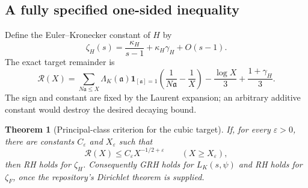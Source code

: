 \documentclass[11pt,letterpaper]{article}
\newtheorem{theorem}{Theorem}[section]
\theoremstyle{definition}\newtheorem{definition}[theorem]{Definition}
\theoremstyle{remark}\newtheorem{remark}[theorem]{Remark}
\newcommand{\one}{\mathbf 1}\newcommand{\code}[1]{\texttt{\small #1}}
\begin{document}
\subsection{A fully specified one-sided inequality}
Define the Euler--Kronecker constant of $H$ by
\[
 \zeta_H(s)=\frac{\kappa_H}{s-1}+\kappa_H\gamma_H+O(s-1).
\]
The exact target remainder is
\begin{equation}\label{eq:targetR}
 \boxed{\displaystyle
 \mathcal R(X)=
 \sum_{N\mathfrak a\le X}\Lambda_K(\mathfrak a)\one_{[\mathfrak a]=1}
 \left(\frac1{N\mathfrak a}-\frac1X\right)
 -\frac{\log X}{3}+\frac{1+\gamma_H}{3}.}
\end{equation}
The sign and constant are fixed by the Laurent expansion; an arbitrary additive constant
would destroy the desired decaying bound.

\begin{theorem}[Principal-class criterion for the cubic target]\label{thm:cubiccriterion}
If, for every $\varepsilon>0$, there are constants $C_\varepsilon$ and $X_\varepsilon$ such that
\begin{equation}\label{eq:missing}
 \mathcal R(X)\le C_\varepsilon X^{-1/2+\varepsilon}
 \qquad(X\ge X_\varepsilon),
\end{equation}
then RH holds for $\zeta_H$. Consequently GRH holds for $L_K(s,\psi)$ and RH holds for
$\zeta_F$, once the repository's Dirichlet theorem is supplied.
\end{theorem}
\end{document}
